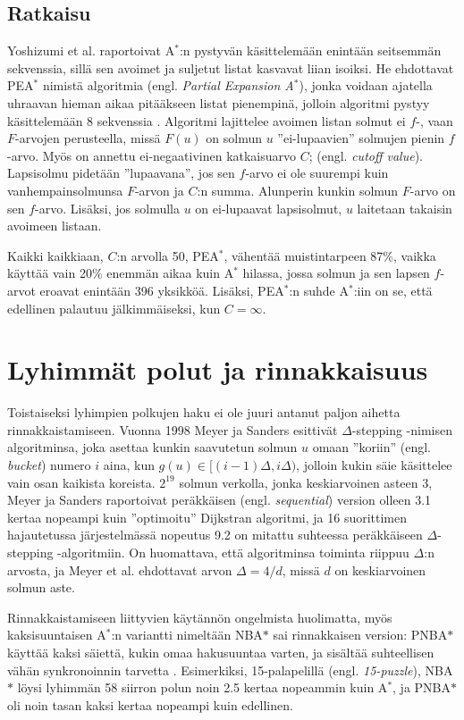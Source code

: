 \documentclass[finnish]{tktltiki2}
\theoremstyle{definition}
\theoremstyle{remark}
\begin{document}
\subsection{Ratkaisu}
Yoshizumi et al. raportoivat A$^{\ast}$:n pystyvän käsittelemään enintään seitsemmän sekvenssia, sillä sen avoimet ja suljetut listat kasvavat liian isoiksi. He ehdottavat PEA$^{\ast}$ nimistä algoritmia (engl. \textit{Partial Expansion A}$^\ast$), jonka voidaan ajatella uhraavan hieman aikaa pitääkseen listat pienempinä, jolloin algoritmi pystyy käsittelemään 8 sekvenssia \cite{Yoshizumi00}. Algoritmi lajittelee avoimen listan solmut ei $f$-, vaan $F$-arvojen perusteella, missä $F(u)$ on solmun $u$ ''ei-lupaavien'' solmujen pienin $f$-arvo. Myös on annettu ei-negaativinen katkaisuarvo $C$; (engl. \textit{cutoff value}). Lapsisolmu pidetään ''lupaavana'', jos sen $f$-arvo ei ole suurempi kuin vanhempainsolmunsa $F$-arvon ja $C$:n summa. Alunperin kunkin solmun $F$-arvo on sen $f$-arvo. Lisäksi, jos solmulla $u$ on ei-lupaavat lapsisolmut, $u$ laitetaan takaisin avoimeen listaan. 

Kaikki kaikkiaan, $C$:n arvolla 50, PEA$^{\ast}$, vähentää muistintarpeen 87\%, vaikka käyttää vain 20\% enemmän aikaa kuin A$^{\ast}$ hilassa, jossa solmun ja sen lapsen $f$-arvot eroavat enintään 396 yksikköä. Lisäksi, PEA$^{\ast}$:n suhde A$^{\ast}$:iin on se, että edellinen palautuu jälkimmäiseksi, kun $C = \infty$.

\section{Lyhimmät polut ja rinnakkaisuus}
Toistaiseksi lyhimpien polkujen haku ei ole juuri antanut paljon aihetta rinnakkaistamiseen. Vuonna 1998 Meyer ja Sanders esittivät $\Delta$-stepping -nimisen algoritminsa, joka asettaa kunkin saavutetun solmun $u$ omaan ''koriin'' (engl. \textit{bucket}) numero $i$ aina, kun $g(u) \in [(i - 1)\Delta, i\Delta)$, jolloin kukin säie käsittelee vain osan kaikista koreista. $2^{19}$ solmun verkolla, jonka keskiarvoinen asteen 3, Meyer ja Sanders raportoivat peräkkäisen (engl. \textit{sequential}) version olleen 3.1 kertaa nopeampi kuin ''optimoitu'' Dijkstran algoritmi, ja 16 suorittimen hajautetussa järjestelmässä nopeutus 9.2 on mitattu suhteessa peräkkäiseen $\Delta$-stepping -algoritmiin. On huomattava, että algoritminsa toiminta riippuu $\Delta$:n arvosta, ja Meyer et al. ehdottavat arvon $\Delta = 4/d$, missä $d$ on keskiarvoinen solmun aste.

Rinnakkaistamiseen liittyvien käytännön ongelmista huolimatta, myös kaksisuuntaisen A$^{\ast}$:n variantti nimeltään NBA$\ast$ sai rinnakkaisen version: PNBA$\ast$ käyttää kaksi säiettä, kukin omaa hakusuuntaa varten, ja sisältää suhteellisen vähän synkronoinnin tarvetta \cite{Rios}. Esimerkiksi, 15-palapelillä (engl. \textit{15-puzzle}), NBA$\ast$ löysi lyhimmän 58 siirron polun noin 2.5 kertaa nopeammin kuin A$^{\ast}$, ja PNBA$\ast$ oli noin tasan kaksi kertaa nopeampi kuin edellinen.
\end{document}
